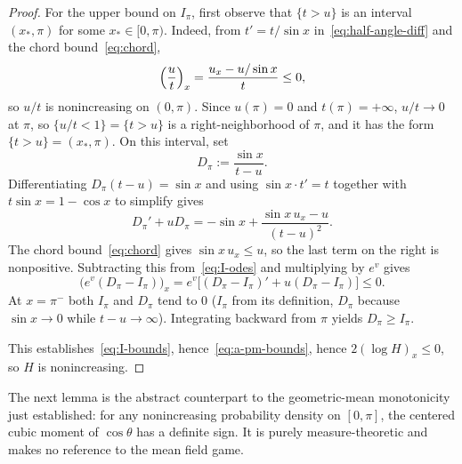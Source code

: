 \documentclass{amsart}
\begin{document}
\begin{proof}
For the upper bound on $I_\pi$, first observe that $\{t>u\}$ is an
interval $(x_*,\pi)$ for some $x_*\in[0,\pi)$. Indeed, from $t'=t/\sin x$
in~\eqref{eq:half-angle-diff} and the chord bound~\eqref{eq:chord},
\[
\Bigl(\frac u t\Bigr)_x=\frac{u_x-u/\sin x}{t}\leq 0,
\]
so $u/t$ is nonincreasing on $(0,\pi)$. Since $u(\pi)=0$ and
$t(\pi)=+\infty$, $u/t\to 0$ at $\pi$, so $\{u/t<1\}=\{t>u\}$ is a
right-neighborhood of $\pi$, and it has the form
$\{t>u\}=(x_*,\pi)$. On this interval, set
\[
D_\pi:=\frac{\sin x}{t-u}.
\]
Differentiating $D_\pi(t-u)=\sin x$ and using $\sin x\cdot t'=t$
together with $t\sin x=1-\cos x$ to simplify gives
\[
D_\pi'+uD_\pi=-\sin x+\frac{\sin x\,u_x-u}{(t-u)^2}.
\]
The chord bound~\eqref{eq:chord} gives $\sin x\,u_x\leq u$, so the
last term on the right is nonpositive. Subtracting this from~\eqref{eq:I-odes} and multiplying
by $e^v$ gives
\[
\bigl(e^v(D_\pi-I_\pi)\bigr)_x=e^v\bigl[(D_\pi-I_\pi)'+u(D_\pi-I_\pi)\bigr]\leq 0.
\]
At $x=\pi^-$ both $I_\pi$ and $D_\pi$ tend to $0$ ($I_\pi$ from its
definition, $D_\pi$ because $\sin x\to 0$ while $t-u\to\infty$).
Integrating backward from $\pi$ yields $D_\pi\geq I_\pi$.

This establishes~\eqref{eq:I-bounds}, hence~\eqref{eq:a-pm-bounds},
hence $2(\log H)_x\leq 0$, so $H$ is nonincreasing.
\end{proof}

The next lemma is the abstract counterpart to the geometric-mean
monotonicity just established: for any nonincreasing probability density
on $[0,\pi]$, the centered cubic moment of $\cos\theta$ has a definite
sign. It is purely measure-theoretic and makes no reference to the mean
field game.
\end{document}
